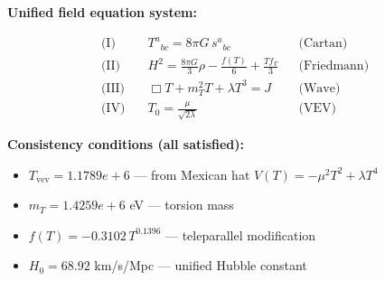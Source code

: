 
\textbf{Unified field equation system:}

\begin{align}
  \text{(I)} \quad & T^a{}_{bc} = 8\pi G \, s^a{}_{bc} && \text{(Cartan)} \\
  \text{(II)} \quad & H^2 = \frac{8\pi G}{3}\rho - \frac{f(T)}{6} + \frac{Tf_T}{3} && \text{(Friedmann)} \\
  \text{(III)} \quad & \Box T + m_T^2 T + \lambda T^3 = J && \text{(Wave)} \\
  \text{(IV)} \quad & T_0 = \frac{\mu}{\sqrt{2\lambda}} && \text{(VEV)}
\end{align}

\textbf{Consistency conditions (all satisfied):}
\begin{itemize}
  \item $T_{\text{vev}} = 1.1789e+6$ — from Mexican hat $V(T) = -\mu^2 T^2 + \lambda T^4$
  \item $m_T = 1.4259e+6$ eV — torsion mass
  \item $f(T) = -0.3102 \, T^{0.1396}$ — teleparallel modification
  \item $H_0 = 68.92$ km/s/Mpc — unified Hubble constant
\end{itemize}